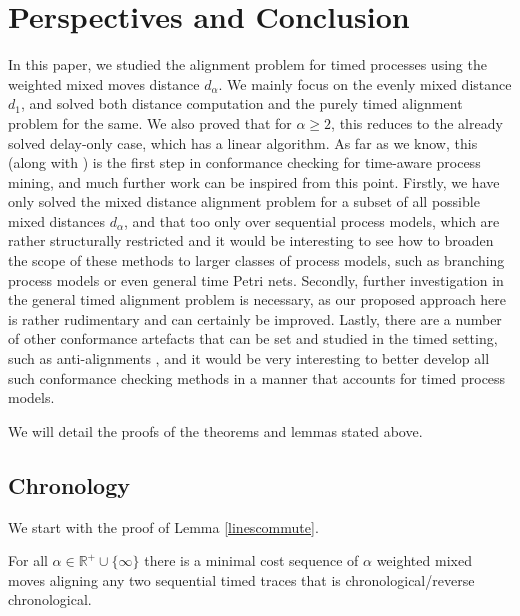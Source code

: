 \documentclass[runningheads]{llncs}
\begin{document}
\section{Perspectives and Conclusion}
In this paper, we studied the alignment problem for timed processes using the weighted mixed moves distance $d_{\alpha}$. 
 We mainly focus on the evenly mixed distance $d_1$, and solved both distance computation and the purely timed alignment problem for the same. 
 We also proved that for $\alpha \geq 2$, this reduces to the already solved delay-only case, which has a linear algorithm.
 As far as we know, this (along with \cite{CR22}) is the first step in conformance checking for time-aware process mining, 
and much further work can be inspired from this point. 
Firstly, we have only solved the mixed distance alignment problem for a subset of all possible mixed distances $d_{\alpha}$, and that too only over sequential process models, which are rather structurally restricted and it would be interesting to see how to broaden the scope of these methods to larger classes of process models, such as branching process models or even general time Petri nets. 
Secondly, further investigation in the general timed alignment problem is necessary, as our proposed approach here is rather rudimentary and can certainly be improved. 
Lastly, there are a number of other conformance artefacts that can be set and studied in the timed setting, such as anti-alignments \cite{CBC21}, and it would be very interesting to better develop all such conformance checking methods in a manner that accounts for timed process models.


%
%
%


\clearpage
\appendix
We will detail the proofs of the theorems and lemmas stated above. 

\subsection{Chronology}
We start with the proof of Lemma \ref{linescommute}. 

\begin{lemma*}For all $\alpha \in \mathbb{R}^+ \cup \{\infty\}$ there is a minimal cost sequence of $\alpha$ weighted mixed moves aligning any two sequential timed traces that is chronological/reverse chronological. 
\end{lemma*}
\end{document}

